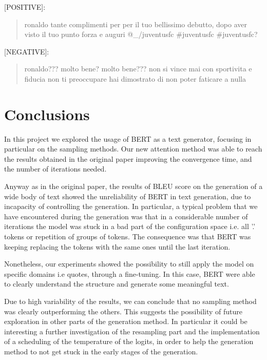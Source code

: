 \documentclass[10pt,twocolumn,letterpaper]{article}
\begin{document}
[POSITIVE]:
\begin{quote}
   ronaldo tante complimenti per per il tuo bellissimo debutto, dopo aver visto il tuo punto forza e auguri @\_/juventusfc #juventusfc #juventusfc?
\end{quote}

[NEGATIVE]:
\begin{quote}
   ronaldo??? molto bene? molto bene??? non si vince mai con sportivita e fiducia non ti preoccupare hai dimostrato di non poter faticare a nulla
\end{quote}


\section{Conclusions}
In this project we explored the usage of BERT as a text generator,
focusing in particular on the sampling methods.
Our new attention method was able to reach the results obtained in the original paper
improving the convergence time, and the number of iterations needed.

Anyway as in the original paper, the results of BLEU score on the generation of a wide body of text
showed the unreliability of BERT in text generation, due to incapacity of controlling the generation.
In particular, a typical problem that we have encountered during the generation was that in
a considerable number of iterations the model was stuck in a bad part of the
configuration space i.e. all '.' tokens or repetition of groups of tokens.
The consequence was that BERT was keeping replacing the tokens with the same ones until the last iteration.

Nonetheless, our experiments showed the possibility to still apply the model
on specific domains i.e quotes, through a fine-tuning.
In this case, BERT were able to clearly understand
the structure and generate some meaningful text.

Due to high variability of the results, we can conclude that no sampling method was clearly
outperforming the others. This suggests the possibility of future exploration in other parts
of the generation method. In particular it could be interesting a further investigation
of the resampling part and the implementation of a scheduling of the temperature of the logits,
in order to help the generation method to not get stuck in the early stages of the generation.



\end{document}
